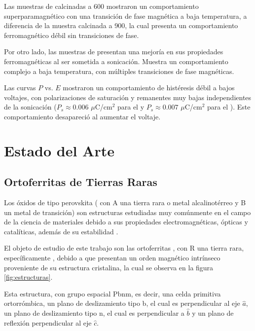 \documentclass[../main.tex]{subfiles}
\begin{document}
Las muestras de \neod{} calcinadas a 600\gradoC{} mostraron un comportamiento superparamagnético con una transición de fase magnética a baja temperatura, a diferencia de la muestra calcinada a 900\gradoC{}, la cual presenta un comportamiento ferromagnético débil sin transiciones de fase.

Por otro lado, las muestras de \sama{} presentan una mejoría en sus propiedades ferromagnéticas al ser sometida a sonicación. Muestra un comportamiento complejo a baja temperatura, con múltiples transiciones de fase magnéticas.

Las curvas $P$ vs. $E$ mostraron un comportamiento de histéresis débil a bajos voltajes, con polarizaciones de saturación y remanentes muy bajas independientes de la sonicación ($P_s\approx 0.006$ $\mu$C/cm$^2$ para el \neod{} y $P_s\approx 0.007$ $\mu$C/cm$^2$ para el \sama{}). Este comportamiento desapareció al aumentar el voltaje.
\chapter{Estado del Arte}
\section{Ortoferritas de Tierras Raras}
Los óxidos de tipo perovskita ( con A una tierra rara o metal alcalinotérreo y B un metal de transición) son estructuras estudiadas muy comúnmente en el campo de la ciencia de materiales debido a sus propiedades electromagnéticas, ópticas y catalíticas, además de su estabilidad \cite{Wang2019}.

El objeto de estudio de este trabajo son las ortoferritas , con R una tierra rara, específicamente , debido a que presentan un orden magnético intrínseco proveniente de su estructura cristalina, la cual se observa en la figura \ref{fig:estructuras}. 

Esta estructura, con grupo espacial Pbnm, es decir, una celda primitiva ortorrómbica, un plano de deslizamiento tipo b, el cual es perpendicular al eje $\hat{a}$, un plano de deslizamiento tipo n, el cual es perpendicular a $\hat{b}$ y un plano de reflexión perpendicular al eje $\hat{c}$.
\end{document}
